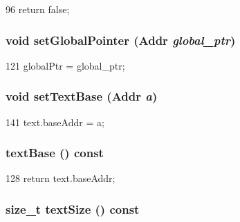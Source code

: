 \begin{DoxyCode}
96     { return false; }
\end{DoxyCode}
\hypertarget{classObjectFile_a31ebe109c735ee4f1460edce76d98426}{
\subsubsection[{setGlobalPointer}]{\setlength{\rightskip}{0pt plus 5cm}void setGlobalPointer ({\bf Addr} {\em global\_\-ptr})}}
\label{classObjectFile_a31ebe109c735ee4f1460edce76d98426}



\begin{DoxyCode}
121 { globalPtr = global_ptr; }
\end{DoxyCode}
\hypertarget{classObjectFile_a94b9967a6f94e8ea6fee38d6ae664405}{
\subsubsection[{setTextBase}]{\setlength{\rightskip}{0pt plus 5cm}void setTextBase ({\bf Addr} {\em a})}}
\label{classObjectFile_a94b9967a6f94e8ea6fee38d6ae664405}



\begin{DoxyCode}
141 { text.baseAddr = a; }
\end{DoxyCode}
\hypertarget{classObjectFile_a39d861e1995f538cbc2cdb860602b36e}{
\subsubsection[{textBase}]{ textBase () const}}
\label{classObjectFile_a39d861e1995f538cbc2cdb860602b36e}



\begin{DoxyCode}
128 { return text.baseAddr; }
\end{DoxyCode}
\hypertarget{classObjectFile_afd33bc083adc1815b4e5daf6739e248d}{
\subsubsection[{textSize}]{\setlength{\rightskip}{0pt plus 5cm}size\_\-t textSize () const}}
\label{classObjectFile_afd33bc083adc1815b4e5daf6739e248d}



